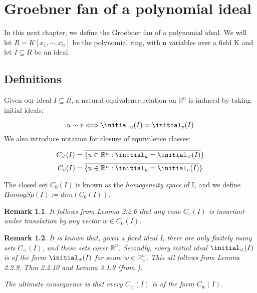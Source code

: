 \documentclass[12pt,a4paper]{report}
\newtheorem{remark}{Remark}
\begin{document}

\chapter{Groebner fan of a polynomial ideal}
In this next chapter, we define the Groebner fan of a polynomial ideal. We will let $R = K[x_{1}, \cdots, x_{n}]$ be the polynomial ring, with n variables over a field K and let $I \subseteq R$ be an ideal.

\section{Definitions}
Given our ideal $I \subseteq R$, a natural equivalence relation on $\mathbb{R}^{n}$ is induced by taking initial ideals:

\begin{equation*}
    u \sim v \Longleftrightarrow \initial_{u} (I) = \initial_{v} (I)
\end{equation*}
We also introduce notation for closure of equivalence classes:

\begin{equation*}
    C_{<} (I) = \overline{ \{u \in \mathbb{R}^{n} : \initial_{u} = \initial_{<} (I)} \}
\end{equation*}
\begin{equation*}
    C_{v} (I) = \overline{ \{u \in \mathbb{R}^{n} : \initial_{u} = \initial_{v} (I)} \}
\end{equation*}

The closed set $C_{0} (I)$ is known as the \emph{homogeneity space} of I, and we define $HomogSp(I) := dim(C_{0} (I))$.

\begin{remark}
It follows from Lemma 2.2.6 that any cone $C_{v} (I)$ is invariant under translation by any vector $w \in C_{0} (I)$.
\end{remark}


\begin{remark}
It is known that, given a fixed ideal I, there are only finitely many sets $C_{<} (I)$, and these sets cover $\mathbb{R} ^{n}$. Secondly, every initial ideal $\initial_{<} (I)$ is of the form $\initial_{w} (I)$ for some $w \in \mathbb{R}_{>} ^{n}$. This all follows from Lemma 2.2.9, Thm 2.2.10 and Lemma 3.1.9 (from \cite{AndersPHD}).

The ultimate consequence is that every $C_{<} (I)$ is of the form $C_{w} (I)$.
\end{remark}
\end{document}
